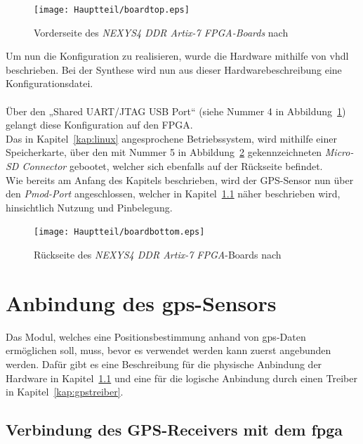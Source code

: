 \begin{figure}[h!]
\centering
\texttt{[image: Hauptteil/boardtop.eps]}
\caption{Vorderseite des \emph{NEXYS4 DDR Artix-7 FPGA-Boards} nach \cite{digilent} }
\label{fig:boardtop}
\end{figure}

Um nun die Konfiguration zu realisieren, wurde die Hardware mithilfe von \ac{vhdl} beschrieben.
Bei der Synthese wird nun aus dieser Hardwarebeschreibung eine Konfigurationsdatei.\cite{mikro}\\\\
Über den „Shared UART/JTAG USB Port“ (siehe Nummer 4 in Abbildung~\ref{fig:boardtop}) gelangt diese Konfiguration
auf den FPGA. \\
Das in Kapitel~\ref{kap:linux} angesprochene Betriebssystem, wird mithilfe einer Speicherkarte, über den mit
Nummer 5 in Abbildung~\ref{fig:boardbottom} gekennzeichneten \emph{Micro-SD Connector} gebootet, welcher sich
ebenfalls auf der Rückseite befindet.\\
Wie bereits am Anfang des Kapitels beschrieben, wird der GPS-Sensor nun über den \emph{Pmod-Port} angeschlossen,
welcher in Kapitel~\ref{kap:gpssensor} näher beschrieben wird, hinsichtlich Nutzung und Pinbelegung.\cite{digilent}\\

\begin{figure}[h!]
\centering
\texttt{[image: Hauptteil/boardbottom.eps]}
\caption{Rückseite des \emph{NEXYS4 DDR Artix-7 FPGA}-Boards nach \cite{digilent} }
\label{fig:boardbottom}
\end{figure}

\section{Anbindung des \ac{gps}-Sensors}\label{kap:gpsimplementierung}

Das Modul, welches eine Positionsbestimmung anhand von \ac{gps}-Daten ermöglichen soll, muss, bevor es verwendet
werden kann zuerst angebunden werden. Dafür gibt es eine Beschreibung für die physische Anbindung der Hardware in
Kapitel~\ref{kap:gpssensor} und eine für die logische Anbindung durch einen Treiber in Kapitel~\ref{kap:gpstreiber}.


\subsection{Verbindung des GPS-Receivers mit dem \ac{fpga}}\label{kap:gpssensor}

